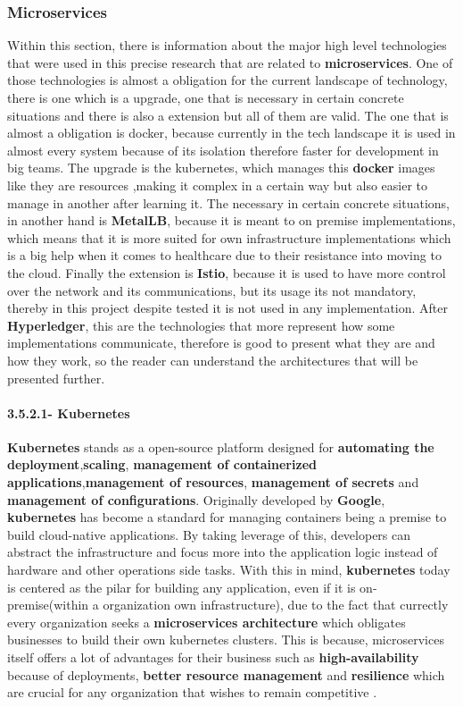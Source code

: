 \subsubsection{Microservices}
Within this section, there is information about the major high level technologies that were used in this precise research that are related 
to \textbf{microservices}. One of those technologies is almost a obligation for the current landscape of technology, there is one which 
is a upgrade, one that is necessary in certain concrete situations and there is also a extension but all of them are valid. The one that 
is almost a obligation is docker, because currently in the tech landscape it is used in almost every system because of its isolation 
therefore faster for development in big teams. The upgrade is the kubernetes, which manages this \textbf{docker} images like they are 
resources ,making it complex in a certain way but also easier to manage in another after learning it. The necessary in certain concrete 
situations, in another hand is \textbf{MetalLB}, because it is meant to on premise implementations, which means that it is more suited 
for own infrastructure implementations which is a big help when it comes to healthcare due to their resistance into moving to 
the cloud. Finally the extension is \textbf{Istio}, because it is used to have more control over the network and its communications, but 
its usage its not mandatory, thereby in this project despite tested it is not used in any implementation.
After \textbf{Hyperledger}, this are the technologies that more represent how some implementations communicate, therefore is good to 
present what they are and how they work, so the reader can understand the architectures that will be presented further. 

\paragraph{3.5.2.1- Kubernetes}\mbox{}

\textbf{Kubernetes} stands as a open-source platform designed for \textbf{automating the deployment},\textbf{scaling}, 
\textbf{management of containerized applications},\textbf{management of resources}, \textbf{management of secrets} and 
\textbf{management of configurations}. Originally developed by \textbf{Google}, \textbf{kubernetes} has become a standard for 
managing containers being a premise to build cloud-native applications. By taking leverage of this, developers can abstract the 
infrastructure and focus more into the application logic instead of hardware and other operations side tasks. With this in mind, 
\textbf{kubernetes} today is centered as the pilar for building any application, even if it is on-premise(within a organization 
own infrastructure), due to the fact that currectly every organization seeks a \textbf{microservices architecture} which obligates 
businesses to build their own kubernetes clusters. This is because, microservices itself offers a lot of advantages for their business 
such as \textbf{high-availability} because of deployments, \textbf{better resource management} and \textbf{resilience} which are crucial 
for any organization that wishes to remain competitive \cite{kubernetes}. 

